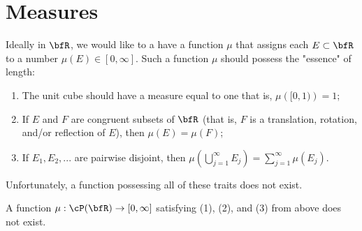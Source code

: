 \chapter{Measures}

Ideally in $\bfR$, we would like to a have a function $\mu$ that assigns each $E \subset \bfR$ to a number $\mu(E) \in [0,\infty]$. Such a function $\mu$ should possess the "essence" of length:
    \begin{enumerate}[label = \arabic*.,itemsep=1pt,topsep=3pt]
        \item The unit cube should have a measure equal to one \textemdash that is, $\mu \left( [0,1)\right) =1 $;
        \item If $E$ and $F$ are congruent subsets of $\bfR$ (that is, $F$ is a translation, rotation, and/or reflection of $E$), then $\mu(E) = \mu(F)$;
        \item If $E_1,E_2,...$ are pairwise disjoint, then $\mu \left( \bigcup_{j = 1}^\infty E_j \right) = \sum_{j = 1}^\infty \mu(E_j)$.
    \end{enumerate}
Unfortunately, a function possessing all of these traits does not exist. 
    \begin{theorem}
        A function $\mu:\cP(\bfR) \rightarrow [0,\infty]$ satisfying (1), (2), and (3) from above does not exist.
    \end{theorem}
